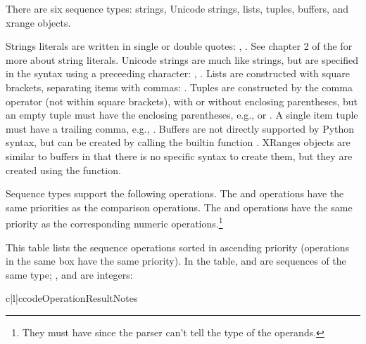 There are six sequence types: strings, Unicode strings, lists,
tuples, buffers, and xrange objects.

Strings literals are written in single or double quotes:
, .  See chapter 2 of the
 for more about
string literals.  Unicode strings are much like strings, but are
specified in the syntax using a preceeding  character:
, .  Lists are constructed with square brackets,
separating items with commas: \code{[a, b, c]}.  Tuples are
constructed by the comma operator (not within square brackets), with
or without enclosing parentheses, but an empty tuple must have the
enclosing parentheses, e.g.,  or \code{()}.  A single
item tuple must have a trailing comma, e.g., .  Buffers are
not directly supported by Python syntax, but can be created by calling the
builtin function .  XRanges
objects are similar to buffers in that there is no specific syntax to
create them, but they are created using the 
function.

Sequence types support the following operations.  The  and
 operations have the same priorities as the comparison
operations.  The \samp{+} and \samp{*} operations have the same
priority as the corresponding numeric operations.\footnote{They must
have since the parser can't tell the type of the operands.}

This table lists the sequence operations sorted in ascending priority
(operations in the same box have the same priority).  In the table,
 and  are sequences of the same type; , 
and  are integers:

\begin{tableiii}{c|l|c}{code}{Operation}{Result}{Notes}
  \hline
  \hline
  \hline
\end{tableiii}

